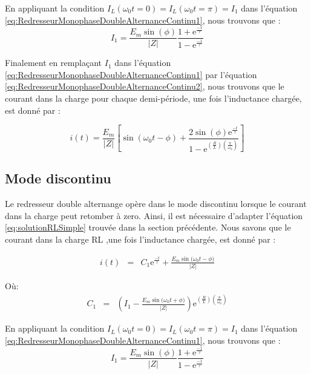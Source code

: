 En appliquant la condition $I_L(\omega_0 t = 0)=I_L(\omega_0 t=\pi)=I_1$ dans l'équation \ref{eq:RedresseurMonophaseDoubleAlternanceContinu1}, nous trouvons que :
\begin{equation}
\label{eq:RedresseurMonophaseDoubleAlternanceContinu2}
	I_1 = \frac{E_m\sin{(\phi)}}{|Z|}  \frac{1 + \mbox{e}^{\frac{-1}{\tau}}}{1 - \mbox{e}^{\frac{-1}{\tau}}}
\end{equation}

Finalement en remplaçant $I_1$ dans l'équation \ref{eq:RedresseurMonophaseDoubleAlternanceContinu1} par l'équation \ref{eq:RedresseurMonophaseDoubleAlternanceContinu2}, nous trouvons que le courant dans la charge pour chaque demi-période, une fois l'inductance chargée, est donné par :

\begin{equation}
	i(t) = \frac{E_m}{|Z|}\left[\sin{(\omega_0 t - \phi)} + \frac{2\sin(\phi) \mbox{e}^{\frac{-t}{\tau}}}{1-\mbox{e}^{\left(\frac{R}{L}\right)\left(\frac{\pi}{\omega_0}\right)}} \right] 
\end{equation}

\subsection{Mode discontinu}
Le redresseur double alternange opère dans le mode discontinu lorsque le courant dans la charge peut retomber à zero. Ainsi, il est nécessaire d'adapter l'équation \ref{eq:solutionRLSimple} trouvée dans la section précédente. Nous savons que le courant dans la charge RL ,une fois l'inductance chargée, est donné par :

\begin{eqnarray}
\label{eq:RedresseurMonophaseDoubleAlternanceContinu1}
i(t) &=& C_1\mbox{e}^{\frac{-t}{\tau}} + \frac{E_m\sin{(\omega_0 t - \phi})}{|Z|}
\end{eqnarray}

Où:
\begin{eqnarray}
C_1 &=& \left( I_1 - \frac{E_m\sin{(\omega_0 t + \phi})}{|Z|}\right)\mbox{e}^{\left(\frac{R}{L}\right)\left(\frac{\pi}{\omega_0}\right)}
\end{eqnarray}

En appliquant la condition $I_L(\omega_0 t = 0)=I_L(\omega_0 t=\pi)=I_1$ dans l'équation \ref{eq:RedresseurMonophaseDoubleAlternanceContinu1}, nous trouvons que :
\begin{equation}
\label{eq:RedresseurMonophaseDoubleAlternanceContinu2}
	I_1 = \frac{E_m\sin{(\phi)}}{|Z|}  \frac{1 + \mbox{e}^{\frac{-1}{\tau}}}{1 - \mbox{e}^{\frac{-1}{\tau}}}
\end{equation}

